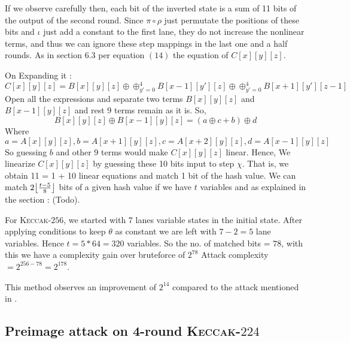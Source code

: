\documentclass[runningheads]{llncs}
\DeclarePairedDelimiter\floor{\lfloor}{\rfloor}
\newcommand{\KECCAK}{\mbox{\textsc{Keccak}}}
\newcommand{\Keccak}{\mbox{\textsc{Keccak}}}
\begin{document}
If we observe carefully then, each bit of the inverted state is a sum of 11 bits of the output of the second round. Since $\pi \circ \rho$ just permutate the positions of these bits and $\iota$ just add a constant to the first lane, they do not increase the nonlinear terms, and thus we can ignore these step mappings in the last one and a half rounds. As in section 6.3 per equation $(14)$ the equation of $C[x][y][z]$. 

On Expanding it :
    \[
        C[x][y][z] = B[x][y][z] \oplus \oplus_{y' = 0}^{4} B[x-1][y'][z] \oplus \oplus_{y' = 0}^{4} B[x+1][y'][z-1]
    \]
    Open all the expressions and separate two terms $B[x][y][z]$ and $B[x-1][y][z]$ and rest 9 terms remain as it is.
    So, \[ B[x][y][z] \oplus B[x-1][y][z] = (a \oplus c + b) \oplus d
    \]
    Where \[
        a = A[x][y][z], b = A[x + 1][y][z], c = A[x + 2][y][z], d = A[x - 1][y][z]
    \]
    So guessing $b$ and other 9 terms would make $C[x][y][z]$ linear. Hence, We linearize $C[x][y][z]$ by guessing these 10 bits input to step $\chi$. That is, we obtain 11 = 1 + 10 linear equations and match 1 bit of the hash value.
We can match $2\floor*{\frac{t - 5}{8}}$ bits of a given hash value if we have $t$ variables \cite{guo2016linear} and as explained in the section : (Todo).

For \Keccak-$256$, we started with $7$ lanes variable states in the initial state. After applying conditions to keep $\theta$ as constant we are left with $7 - 2 = 5$ lane variables. Hence $t = 5*64 = 320$ variables.
So the no. of matched bits = $78$, with this we have a complexity gain over bruteforce of $2^{78}$
Attack complexity $ = 2^{256 - 78} = 2^{178}$.

This method observes an improvement of $2^{14}$ compared to the attack mentioned in \cite{guo2016linear}.

\subsection{Preimage attack on 4-round \KECCAK-$224$}
\end{document}
